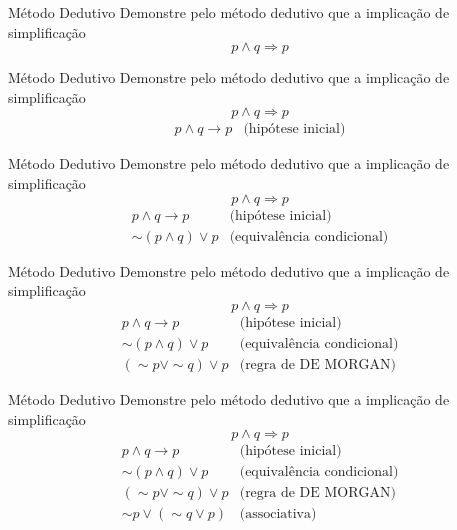 \begin{frame}[t]{Método Dedutivo}
	Demonstre pelo método dedutivo que a implicação de simplificação $$p \wedge q \Rightarrow p$$
\end{frame}

\begin{frame}[t]{Método Dedutivo}
	Demonstre pelo método dedutivo que a implicação de simplificação $$p \wedge q \Rightarrow p$$
	\vskip 0.2cm
	$$\begin{array}{cl}
	p \wedge q \rightarrow p & \mbox{(hipótese inicial)}
	\end{array}$$
\end{frame}

\begin{frame}[t]{Método Dedutivo}
	Demonstre pelo método dedutivo que a implicação de simplificação $$p \wedge q \Rightarrow p$$
	\vskip 0.2cm
	$$\begin{array}{cl}
	p \wedge q \rightarrow p & \mbox{(hipótese inicial)} \\
	\sim(p \wedge q) \vee p & \mbox{(equivalência condicional)} 
	\end{array}$$
\end{frame}

\begin{frame}[t]{Método Dedutivo}
	Demonstre pelo método dedutivo que a implicação de simplificação $$p \wedge q \Rightarrow p$$
	\vskip 0.2cm
	$$\begin{array}{cl}
	p \wedge q \rightarrow p & \mbox{(hipótese inicial)} \\
	\sim(p \wedge q) \vee p & \mbox{(equivalência condicional)} \\
	(\sim p \vee\sim q) \vee p & \mbox{(regra de DE MORGAN)} 
	\end{array}$$
\end{frame}

\begin{frame}[t]{Método Dedutivo}
	Demonstre pelo método dedutivo que a implicação de simplificação $$p \wedge q \Rightarrow p$$
	\vskip 0.2cm
	$$\begin{array}{cl}
	p \wedge q \rightarrow p & \mbox{(hipótese inicial)} \\
	\sim(p \wedge q) \vee p & \mbox{(equivalência condicional)} \\
	(\sim p \vee\sim q) \vee p & \mbox{(regra de DE MORGAN)} \\
	\sim p \vee (\sim q \vee p) & \mbox{(associativa)} 
	\end{array}$$
\end{frame}

